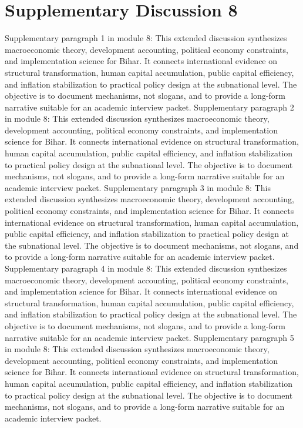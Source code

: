 \documentclass[preprint,12pt]{elsarticle}
\begin{document}
\section{Supplementary Discussion 8}
Supplementary paragraph 1 in module 8: This extended discussion synthesizes macroeconomic theory, development accounting, political economy constraints, and implementation science for Bihar. It connects international evidence on structural transformation, human capital accumulation, public capital efficiency, and inflation stabilization to practical policy design at the subnational level. The objective is to document mechanisms, not slogans, and to provide a long-form narrative suitable for an academic interview packet.
Supplementary paragraph 2 in module 8: This extended discussion synthesizes macroeconomic theory, development accounting, political economy constraints, and implementation science for Bihar. It connects international evidence on structural transformation, human capital accumulation, public capital efficiency, and inflation stabilization to practical policy design at the subnational level. The objective is to document mechanisms, not slogans, and to provide a long-form narrative suitable for an academic interview packet.
Supplementary paragraph 3 in module 8: This extended discussion synthesizes macroeconomic theory, development accounting, political economy constraints, and implementation science for Bihar. It connects international evidence on structural transformation, human capital accumulation, public capital efficiency, and inflation stabilization to practical policy design at the subnational level. The objective is to document mechanisms, not slogans, and to provide a long-form narrative suitable for an academic interview packet.
Supplementary paragraph 4 in module 8: This extended discussion synthesizes macroeconomic theory, development accounting, political economy constraints, and implementation science for Bihar. It connects international evidence on structural transformation, human capital accumulation, public capital efficiency, and inflation stabilization to practical policy design at the subnational level. The objective is to document mechanisms, not slogans, and to provide a long-form narrative suitable for an academic interview packet.
Supplementary paragraph 5 in module 8: This extended discussion synthesizes macroeconomic theory, development accounting, political economy constraints, and implementation science for Bihar. It connects international evidence on structural transformation, human capital accumulation, public capital efficiency, and inflation stabilization to practical policy design at the subnational level. The objective is to document mechanisms, not slogans, and to provide a long-form narrative suitable for an academic interview packet.
\end{document}
